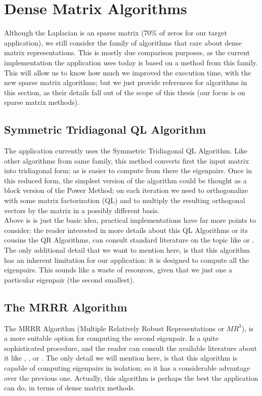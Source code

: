 \section{Dense Matrix Algorithms}

Although the Laplacian is an sparse matrix (70\% of zeros for our
target application), we still consider the family of algorithms that
care about dense matrix representations. This is mostly due comparison
purposes, as the current implementation the application uses today is
based on a method from this family. This will allow us to know how
much we improved the execution time, with the new sparse matrix
algorithms; but we just provide references for 
algorithms in this section, as their details fall out of the scope of
this thesis (our focus is on sparse matrix methods). \\

\subsection{Symmetric Tridiagonal QL Algorithm}
The application currently uses the Symmetric Tridiagonal QL
Algorithm. Like other algorithms from same family, this method
converts first the input matrix into tridiagonal form; as is easier to
compute from there the eigenpairs. Once in this reduced form, the
simplest version of the algorithm could be thought as a block
version of the Power Method; on each iteration we need to
orthogonalize with some matrix factorization (QL) and to multiply the
resulting orthogonal vectors by the matrix in a possibly different
basis. \\

Above is is just the basic idea, practical implementations have far
more points to consider; the reader interested in more details about
this QL Algorithms or its cousins the QR Algorithms, can consult
standard literature on the topic like \cite{golub13} or
\cite{parlett80}. The only additional detail that we want to mention
here, is that this algorithm has an inherent limitation for our
application: it is designed to compute all the eigenpairs. This sounds
like a waste of resources, given that we just one a particular
eigenpair (the second smallest). 

\subsection{The MRRR Algorithm}

The MRRR Algorithm (Multiple Relatively Robust Representations or
$MR^3$), is a more suitable option for computing the second
eigenpair. Is a quite sophisticated procedure, and the reader
can consult the available literature about it like \cite{dhillon97},
\cite{dhillon04}, \cite{dhillon06} or \cite{parlett04}. The only
detail we will mention here, is that this algorithm is capable of
computing eigenpairs in isolation; so it has a considerable advantage
over the previous one. Actually, this algorithm is perhaps the best
the application can do, in terms of dense matrix methods.


